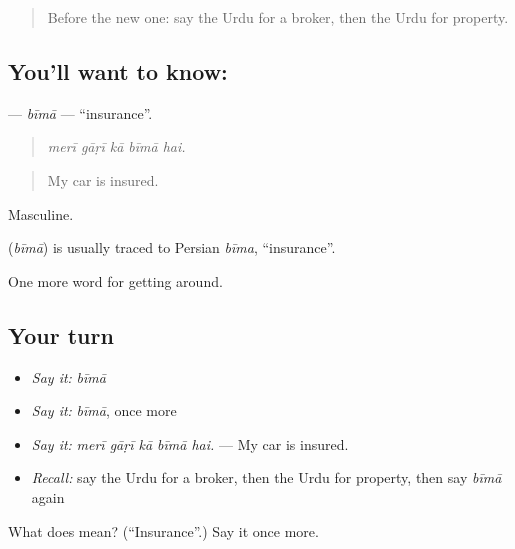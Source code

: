 \begin{quote}
Before the new one: say the Urdu for a broker, then the Urdu for property.
\end{quote}

\subsection*{You'll want to know: }
\textbf{} — \emph{bīmā} — \textquotedblleft{}insurance\textquotedblright{}.

\begin{quote}
    
\end{quote}

\begin{quote}
\emph{merī gāṛī kā bīmā hai.}
\end{quote}

\begin{quote}
My car is insured.
\end{quote}

Masculine.

\begin{cousinweb}
\textbf{} (\emph{bīmā}) is usually traced to Persian \emph{bīma}, \textquotedblleft{}insurance\textquotedblright{}.
\end{cousinweb}

\begin{grammarlens}[title={What you've built}]
One more word for getting around.
\end{grammarlens}

\subsection*{Your turn}
\begin{itemize}
\raggedright
  \item \emph{Say it:} \emph{bīmā}
  \item \emph{Say it:} \emph{bīmā}, once more
  \item \emph{Say it:} \emph{merī gāṛī kā bīmā hai.} — My car is insured.
  \item \emph{Recall:} say the Urdu for a broker, then the Urdu for property, then say \emph{bīmā} again
\end{itemize}

\begin{tcolorbox}[breakable,colback=teal!4,colframe=teal!35!black,title={Before you move on}]
What does  mean? (\textquotedblleft{}Insurance\textquotedblright{}.) Say it once more.
\end{tcolorbox}

